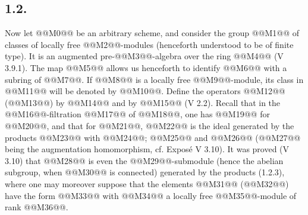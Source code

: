 
\subsection*{1.2.}
Now let @@M0@@ be an arbitrary scheme, and consider the group @@M1@@ of classes of locally free @@M2@@-modules (henceforth understood to be of finite type). It is an augmented pre-@@M3@@-algebra over the ring @@M4@@ (V 3.9.1). The map @@M5@@ allows us henceforth to identify @@M6@@ with a subring of @@M7@@. If @@M8@@ is a locally free @@M9@@-module, its class in @@M11@@ will be denoted by @@M10@@. Define the operators @@M12@@ (@@M13@@) by
@@M14@@
and by
@@M15@@
(V 2.2). Recall that in the @@M16@@-filtration @@M17@@ of @@M18@@, one has @@M19@@ for @@M20@@, and that for @@M21@@, @@M22@@ is the ideal generated by the products
@@M23@@
with @@M24@@; @@M25@@ and @@M26@@ (@@M27@@ being the augmentation homomorphism, cf. Exposé V 3.10). It was proved (V 3.10) that @@M28@@ is even the @@M29@@-submodule (hence the abelian subgroup, when @@M30@@ is connected) generated by the products (1.2.3), where one may moreover suppose that the elements @@M31@@ (@@M32@@) have the form
@@M33@@
with @@M34@@ a locally free @@M35@@-module of rank @@M36@@.

